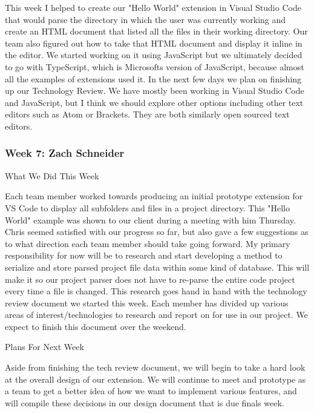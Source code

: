 This week I helped to create our "Hello World" extension in Visual Studio Code that would parse the directory in which the user was currently working and create an HTML document that listed all the files in their working directory. Our team also figured out how to take that HTML document and display it inline in the editor. We started working on it using JavaScript but we ultimately decided to go with TypeScript, which is Microsofts version of JavaScript, because almost all the examples of extensions used it. In the next few days we plan on finishing up our Technology Review. We have mostly been working in Visual Studio Code and JavaScript, but I think we should explore other options including other text editors such as Atom or Brackets. They are both similarly open sourced text editors. \\ 

 \subsubsection{Week 7: Zach Schneider}

What We Did This Week

Each team member worked towards producing an initial prototype extension for VS Code to display all subfolders and files in a project directory. This "Hello World" example was shown to our client during a meeting with him Thursday. Chris seemed satisfied with our progress so far, but also gave a few suggestions as to what direction each team member should take going forward. My primary responsibility for now will be to research and start developing a method to serialize and store parsed project file data within some kind of database. This will make it so our project parser does not have to re-parse the entire code project every time a file is changed. This research goes hand in hand with the technology review document we started this week. Each member has divided up various areas of interest/technologies to research and report on for use in our project. We expect to finish this document over the weekend. 



Plans For Next Week

Aside from finishing the tech review document, we will begin to take a hard look at the overall design of our extension. We will continue to meet and prototype as a team to get a better idea of how we want to implement various features, and will compile these decisions in our design document that is due finals week. \\ 

